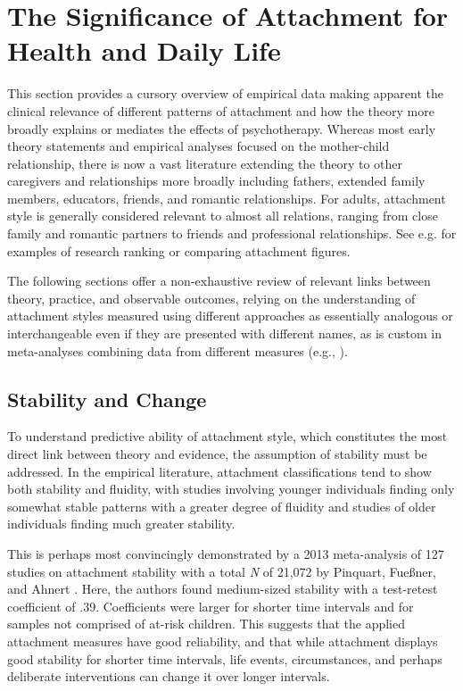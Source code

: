 \documentclass[12pt]{report}
\begin{document}
\chapter{The Significance of Attachment for Health and Daily Life}
\label{sec:theory and review}
This section provides a cursory overview of empirical data making apparent the clinical relevance of different patterns of attachment and how the theory more broadly explains or mediates the effects of psychotherapy.
Whereas most early theory statements and empirical analyses focused on the mother-child relationship, there is now a vast literature extending the theory to other caregivers and relationships more broadly including fathers, extended family members, educators, friends, and romantic relationships.
For adults, attachment style is generally considered relevant to almost all relations, ranging from close family and romantic partners to friends and professional relationships.
See e.g.  for examples of research ranking or comparing attachment figures.

The following sections offer a non-exhaustive review of relevant links between theory, practice, and observable outcomes, relying on the understanding of attachment styles measured using different approaches as essentially analogous or interchangeable even if they are presented with different names, as is custom in meta-analyses combining data from different measures (e.g., ).

\section{Stability and Change}
To understand predictive ability of attachment style, which constitutes the most direct link between theory and evidence, the assumption of stability must be addressed.
In the empirical literature, attachment classifications tend to show both stability and fluidity, with studies involving younger individuals finding only somewhat stable patterns with a greater degree of fluidity and studies of older individuals finding much greater stability.

This is perhaps most convincingly demonstrated by a 2013 meta-analysis of 127 studies on attachment stability with a total \textit{N} of 21,072 by Pinquart, Fueßner, and Ahnert \citeyear{Pinquart2013}.
Here, the authors found medium-sized stability with a test-retest coefficient of .39.
Coefficients were larger for shorter time intervals and for samples not comprised of at-risk children.
This suggests that the applied attachment measures have good reliability, and that while attachment displays good stability for shorter time intervals, life events, circumstances, and perhaps deliberate interventions can change it over longer intervals.
\end{document}
